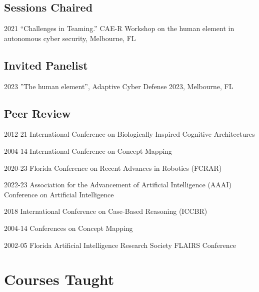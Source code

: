 \documentclass[12pt,letterpaper]{report}
\begin{document}
    \subsection*{Sessions Chaired}

    \begin{tablist}

        \item[2021] \tab{}\enquote{Challenges in Teaming.} CAE-R Workshop on the human element in autonomous cyber security, Melbourne, FL

    \end{tablist}

    \subsection*{Invited Panelist}
    \begin{tablist}
      \item[2023] \tab{}''The human element'', Adaptive Cyber Defense 2023, Melbourne, FL
    \end{tablist}

    \subsection*{Peer Review}

    \begin{tablist}
        \item[2012-21] \tab{}International Conference on Biologically Inspired Cognitive Architectures
        \item[2004-14] \tab{}International Conference on Concept Mapping
        \item[2020-23] \tab{}Florida Conference on Recent Advances in Robotics (FCRAR)
        \item[2022-23] \tab{}Association for the Advancement of Artificial Intelligence (AAAI) Conference on Artificial Intelligence
        \item[2018] \tab{}International Conference on Case-Based Reasoning (ICCBR)
        \item[2004-14] \tab{}Conferences on Concept Mapping 
        \item[2002-05] \tab{}Florida Artificial Intelligence Research Society FLAIRS Conference
    \end{tablist}


    \section*{Courses Taught}
\end{document}
